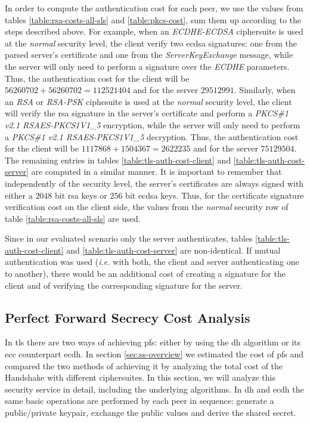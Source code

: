 \documentclass{llncs}
\begin{document}
In order to compute the authentication cost for each peer, we use the values from tables \ref{table:rsa-costs-all-sls} and \ref{table:pkcs-cost},
sum them up according to the steps described above. For example, when an \textit{ECDHE-ECDSA} ciphersuite is used at the \textit{normal} security level,
the client verify two \gls{ecdsa} signatures: one from the parsed server's certificate
and one from the \textit{ServerKeyExchange} message, while the server will only need to perform a signature over the \textit{ECDHE} parameters.
Thus, the authentication cost for the client will be $56260702+56260702=112521404$ and for the server $29512991$. Similarly, when an \textit{RSA} or
\textit{RSA-PSK} ciphesuite is used at the \textit{normal} security level, the client will verify the \gls{rsa} signature in the server's certificate
and perform a \textit{PKCS\#1 v2.1 RSAES-PKCS1\-V1\_5} encryption, while the server will only need to perform a
\textit{PKCS\#1 v2.1 RSAES-PKCS1\-V1\_5} decryption. Thus, the authentication cost for the client will be $1117868+1504367=2622235$ and for the server
$75129504$. The remaining entries in tables \ref{table:tls-auth-cost-client} and \ref{table:tls-auth-cost-server} are computed in a similar manner.
It is important to remember that independently of the security level, the server's certificates are always signed with either a $2048$ bit \gls{rsa}
keys or $256$ bit \gls{ecdsa} keys. Thus, for the certificate signature verification cost on the client side, the values from the \textit{normal}
security row of table \ref{table:rsa-costs-all-sls} are used.

Since in our evaluated scenario only the server authenticates, tables \ref{table:tls-auth-cost-client} and \ref{table:tls-auth-cost-server}
are non-identical. If mutual authentication was used (\textit{i.e.} with both, the client and server authenticating one to another), there would be
an additional cost of creating a signature for the client and of verifying the corresponding signature for the server.

\subsection{Perfect Forward Secrecy Cost Analysis} \label{sec:pfs-costs}

In \gls{tls} there are two ways of achieving \gls{pfs}: either by using the \gls{dh} algorithm or its \gls{ecc} counterpart \gls{ecdh}.
In section \ref{sec:ss-overview} we estimated the cost of \gls{pfs} and compared the two methods of achieving it by analyzing the total cost of the
Handshake with different ciphersuites. In this section, we will analyze this security service in detail, including the underlying algorithms.
In \gls{dh} and \gls{ecdh} the same basic operations are performed by each peer in sequence: generate a public/private keypair, exchange the public values
and derive the shared secret.
\end{document}
